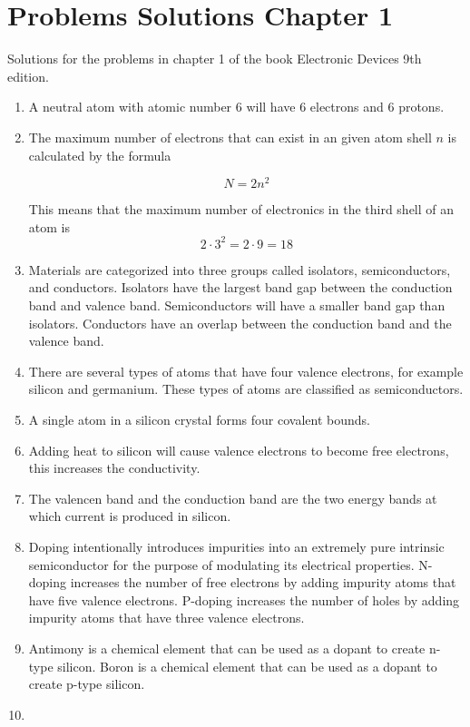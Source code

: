 \documentclass[fleqn]{article}
\begin{document}
\section*{Problems Solutions Chapter 1}
Solutions for the problems in chapter 1 of the book Electronic Devices 9th edition.

\begin{enumerate}[label=\textbf{\arabic*.}]

\item A neutral atom with atomic number 6 will have 6 electrons and 6 protons. 
  
\item The maximum number of electrons that can exist in an given atom shell $ n $ is calculated by the formula

\[
  N = 2n^2
\]

This means that the maximum number of electronics in the third shell of an atom is
\[ 
  2 \cdot 3^2 = 2 \cdot 9 = 18
\]

\item
Materials are categorized into three groups called isolators, semiconductors, and conductors. Isolators have the largest band gap between the conduction band and valence band. Semiconductors will have a smaller band gap than isolators. Conductors have an overlap between the conduction band and the valence band.

\item
There are several types of atoms that have four valence electrons, for example silicon and germanium. These types of atoms are classified as semiconductors.

\item
A single atom in a silicon crystal forms four covalent bounds.

\item
Adding heat to silicon will cause valence electrons to become free electrons, this increases the conductivity.

\item
The valencen band and the conduction band are the two energy bands at which current is produced in silicon.

\item
Doping intentionally introduces impurities into an extremely pure intrinsic semiconductor for the purpose of modulating its electrical properties. N-doping increases the number of free electrons by adding impurity atoms that have five valence electrons. P-doping increases the number of holes by adding impurity atoms that have three valence electrons.

\item
Antimony is a chemical element that can be used as a dopant to create n-type silicon. Boron is a chemical element that can be used as a dopant to create p-type silicon.

\item


\end{enumerate}
\end{document}
